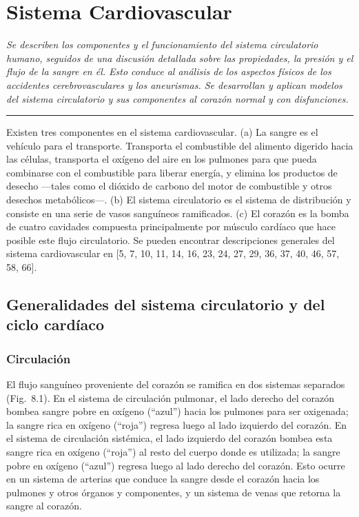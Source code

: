 \documentclass[12pt]{book}
\begin{document}
\setcounter{chapter}{7}

\chapter{Sistema Cardiovascular}

\begin{flushleft}
    \textit{Se describen los componentes y el funcionamiento del sistema circulatorio humano, seguidos de una discusión detallada sobre las propiedades, la presión y el flujo de la sangre en él. Esto conduce al análisis de los aspectos físicos de los accidentes cerebrovasculares y los aneurismas. Se desarrollan y aplican modelos del sistema circulatorio y sus componentes al corazón normal y con disfunciones.}
\end{flushleft}

\hrule
\vspace{1em}

Existen tres componentes en el sistema cardiovascular. (a) La sangre es el vehículo para el transporte. Transporta el combustible del alimento digerido hacia las células, transporta el oxígeno del aire en los pulmones para que pueda combinarse con el combustible para liberar energía, y elimina los productos de desecho ---tales como el dióxido de carbono del motor de combustible y otros desechos metabólicos---. (b) El sistema circulatorio es el sistema de distribución y consiste en una serie de vasos sanguíneos ramificados. (c) El corazón es la bomba de cuatro cavidades compuesta principalmente por músculo cardíaco que hace posible este flujo circulatorio. Se pueden encontrar descripciones generales del sistema cardiovascular en [5, 7, 10, 11, 14, 16, 23, 24, 27, 29, 36, 37, 40, 46, 57, 58, 66].

\section{Generalidades del sistema circulatorio y del ciclo cardíaco}

\subsection{Circulación}

El flujo sanguíneo proveniente del corazón se ramifica en dos sistemas separados (Fig.~8.1). En el sistema de circulación pulmonar, el lado derecho del corazón bombea sangre pobre en oxígeno (``azul'') hacia los pulmones para ser oxigenada; la sangre rica en oxígeno (``roja'') regresa luego al lado izquierdo del corazón. En el sistema de circulación sistémica, el lado izquierdo del corazón bombea esta sangre rica en oxígeno (``roja'') al resto del cuerpo donde es utilizada; la sangre pobre en oxígeno (``azul'') regresa luego al lado derecho del corazón. Esto ocurre en un sistema de arterias que conduce la sangre desde el corazón hacia los pulmones y otros órganos y componentes, y un sistema de venas que retorna la sangre al corazón.
\end{document}
